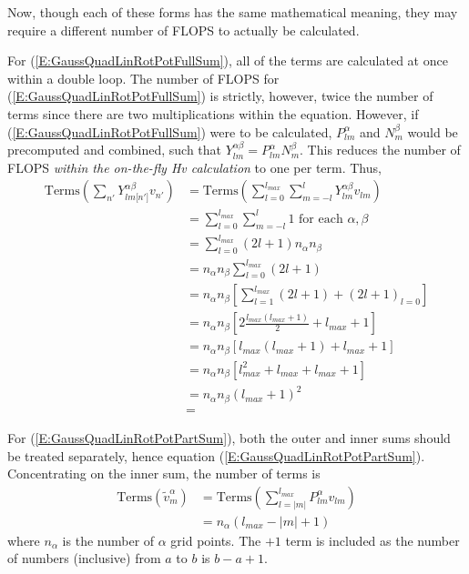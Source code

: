 \documentclass{revtex4-1}
\begin{document}
Now, though each of these forms has the same mathematical meaning, they may require a different number of FLOPS to actually be calculated. 

For (\ref{E:GaussQuadLinRotPotFullSum}), all of the terms are calculated at once within a double loop. The number of FLOPS for (\ref{E:GaussQuadLinRotPotFullSum}) is strictly, however, twice the number of terms since there are two multiplications within the equation. However, if (\ref{E:GaussQuadLinRotPotFullSum}) were to be calculated, $P_{lm}^{\alpha}$ and $N_{m}^{\beta}$ would be precomputed and combined, such that $Y_{lm}^{\alpha\beta} = P_{lm}^{\alpha}N_{m}^{\beta}$. This reduces the number of FLOPS \emph{within the on-the-fly Hv calculation} to one per term. Thus,
\begin{align}
\mbox{Terms}\!\left(\sum_{n'}Y_{lm\lbrack n'\rbrack}^{\alpha\beta}v_{n'}\right) 	&= \mbox{Terms}\!\left(\sum_{l=0}^{l_{max}}\sum_{m=-l}^{l}Y_{lm}^{\alpha\beta}v_{lm}\right) \\
	&= \sum_{l=0}^{l_{max}}\sum_{m=-l}^{l} 1 \mbox{ for each }\alpha,\beta \nonumber \\
	&= \sum_{l=0}^{l_{max}}(2l+1)n_{\alpha}n_{\beta} \nonumber \\
	&= n_{\alpha}n_{\beta}\sum_{l=0}^{l_{max}}(2l+1) \nonumber \\
	&= n_{\alpha}n_{\beta}[\sum_{l=1}^{l_{max}}(2l+1) + (2l+1)_{l=0}] \nonumber \\
	&= n_{\alpha}n_{\beta}[2\frac{l_{max}(l_{max}+1)}{2} + l_{max} + 1] \nonumber \\
	&= n_{\alpha}n_{\beta}[l_{max}(l_{max}+1) + l_{max} + 1] \nonumber \\
	&= n_{\alpha}n_{\beta}[l_{max}^{2} + l_{max} + l_{max} + 1] \nonumber \\
	&= n_{\alpha}n_{\beta}(l_{max} +1)^{2} \\
	&= 
\end{align}



For (\ref{E:GaussQuadLinRotPotPartSum}), both the outer and inner sums should be treated separately, hence equation (\ref{E:GaussQuadLinRotPotPartSum}). Concentrating on the inner sum, the number of terms is
\begin{align}
\mbox{Terms}\!\left(\tilde{v}_{m}^{\alpha}\right) 	&= \mbox{Terms}\!\left(\sum_{l=|m|}^{l_{max}}P_{lm}^{\alpha}v_{lm}\right) \\
													&= n_{\alpha}\left(l_{max}-|m|+1\right)
\end{align}
where $n_{\alpha}$ is the number of $\alpha$ grid points. The $+1$ term is included as the number of numbers (inclusive) from $a$ to $b$ is $b-a+1$.
\end{document}
